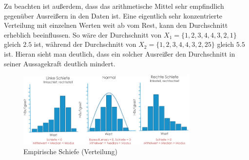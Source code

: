 Zu beachten ist außerdem, dass das arithmetische Mittel sehr empfindlich gegenüber Ausreißern in den Daten ist.
Eine eigentlich sehr konzentrierte Verteilung mit einzelnen Werten weit ab vom Rest, kann den Durchschnitt erheblich beeinflussen.
So wäre der Durchschnitt von $X_1 = \{1,2,3,4,4,3,2,1\}$ gleich $2.5$ ist, während der Durchschnitt von $X_2 = \{1,2,3,4,4,3,2,25\}$ gleich $5.5$ ist.
Hieran sieht man deutlich, dass ein solcher Ausreißer den Durchschnitt in seiner Aussagekraft deutlich mindert.

\begin{figure}
    \centering
    \includegraphics[width=0.8\textwidth]{empirischeSchiefe}
    \caption{Empirische Schiefe (Verteilung)}
    \label{fig:empirischeSchiefe}
\end{figure}

